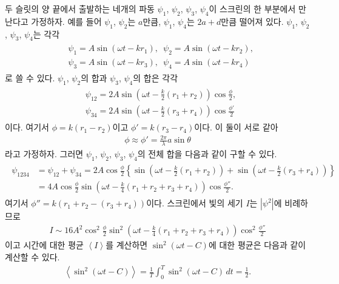 \documentclass[tightenlines,floatfix,nofootinbib,superscriptaddress,fleqn]{revtex4}
\begin{document}
 두 슬릿의 양 끝에서 출발하는 네개의 파동 
$\psi_1$, $\psi_2$, $\psi_3$, $\psi_4$이 스크린의 한 부분에서 만난다고 가정하자.
예를 들어 $\psi_1$, $\psi_2$는 $a$만큼, $\psi_1$, $\psi_4$는 $2a+d$만큼 떨어져 있다.
$\psi_1$, $\psi_2$, $\psi_3$, $\psi_4$는 각각
\begin{align}
  \begin{split}
    &\psi_1=A\sin(\omega t-kr_1),\,\,\,\psi_2=A\sin(\omega t-kr_2), \\
    &\psi_3=A\sin(\omega t-kr_3),\,\,\,\psi_4=A\sin(\omega t-kr_4)
  \end{split}
\end{align}
로 쓸 수 있다. $\psi_1$, $\psi_2$의 합과 $\psi_3$, $\psi_4$의 합은 각각
\begin{align}
  \begin{split}
    &\psi_{12}=2A\sin\left(\omega t-\frac{k}{2}(r_1+r_2)\right)\cos\frac{\phi}{2}, \\
    &\psi_{34}=2A\sin\left(\omega t-\frac{k}{2}(r_3+r_4)\right)\cos\frac{\phi'}{2}
  \end{split}
\end{align}
이다. 여기서 $\phi = k(r_1-r_2)$이고 $\phi' = k(r_3-r_4)$이다. 이 둘이 서로 같아
\begin{align}
  \phi \approx \phi' = \frac{2\pi}{\lambda}a\sin\theta
\end{align}
라고 가정하자. 그러면 $\psi_1$, $\psi_2$, $\psi_3$, $\psi_4$의 전체 합을 다음과 같이
구할 수 있다.
\begin{align}
  \begin{split}
    \psi_{1234} &= \psi_{12}+\psi_{34}
    =2A\cos\frac{\phi}{2}\left\{\sin\left(\omega t-\frac{k}{2}(r_1+r_2)\right)
    +\sin\left(\omega t-\frac{k}{2}(r_3+r_4)\right)\right\} \\
    &=4A\cos\frac{\phi}{2}\sin\left(\omega t-\frac{k}{4}(r_1+r_2+r_3+r_4)\right)
    \cos\frac{\phi''}{2}.
  \end{split}
\end{align}
여기서 $\phi''=k(r_1+r_2-(r_3+r_4))$이다. 스크린에서 빛의 세기 $I$는 $|\psi^2|$에
비례하므로
\begin{align}
  I \sim  16A^2\cos^2\frac{\phi}{2}\sin^2\left(\omega t-\frac{k}{4}(r_1+r_2+r_3+r_4)\right)
  \cos^2\frac{\phi''}{2}
\end{align}
이고 시간에 대한 평균 $\left<I\right>$를 계산하면 $\sin^2(\omega t - C)$에 대한 평균은
다음과 같이 계산할 수 있다.
\begin{align}
  \left<\sin^2(\omega t - C)\right>
  =\frac{1}{T}\int_0^T\sin^2(\omega t - C)\,dt = \frac{1}{2}.
\end{align}
\end{document}
